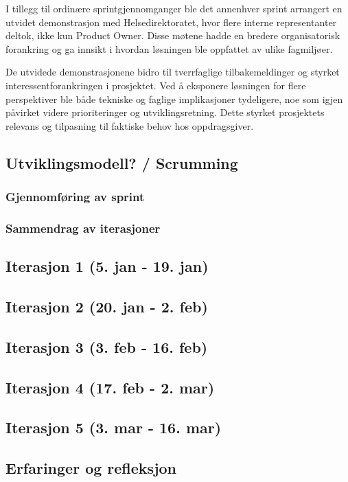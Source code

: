 I tillegg til ordinære sprintgjennomganger ble det annenhver sprint arrangert en utvidet demonstrasjon med Helsedirektoratet, hvor flere interne representanter deltok, ikke kun Product Owner. Disse møtene hadde en bredere organisatorisk forankring og ga innsikt i hvordan løsningen ble oppfattet av ulike fagmiljøer.

De utvidede demonstrasjonene bidro til tverrfaglige tilbakemeldinger og styrket interessentforankringen i prosjektet. Ved å eksponere løsningen for flere perspektiver ble både tekniske og faglige implikasjoner tydeligere, noe som igjen påvirket videre prioriteringer og utviklingsretning. Dette styrket prosjektets relevans og tilpasning til faktiske behov hos oppdragsgiver.

\subsection{Utviklingsmodell? / Scrumming }


\subsubsection{Gjennomføring av sprint}

\subsubsection{Sammendrag av iterasjoner}

\subsection*{Iterasjon 1 (5. jan - 19. jan)}

\subsection*{Iterasjon 2 (20. jan - 2. feb)}

\subsection*{Iterasjon 3 (3. feb - 16. feb)}

\subsection*{Iterasjon 4 (17. feb - 2. mar)}

\subsection*{Iterasjon 5 (3. mar - 16. mar)}

\subsection{Erfaringer og refleksjon}